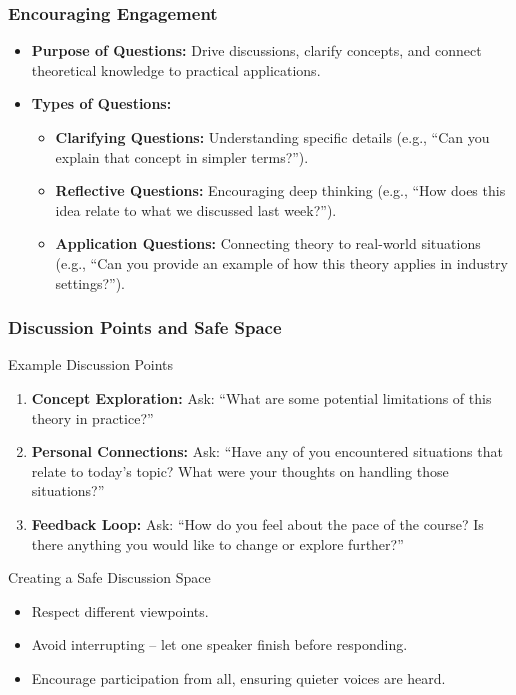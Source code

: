 \documentclass[aspectratio=169]{beamer}
\begin{document}
\begin{frame}[fragile]
  \frametitle{Encouraging Engagement}
  \begin{itemize}
    \item \textbf{Purpose of Questions:} Drive discussions, clarify concepts, and connect theoretical knowledge to practical applications.
    \item \textbf{Types of Questions:}
      \begin{itemize}
        \item \textbf{Clarifying Questions:} Understanding specific details (e.g., ``Can you explain that concept in simpler terms?'').
        \item \textbf{Reflective Questions:} Encouraging deep thinking (e.g., ``How does this idea relate to what we discussed last week?'').
        \item \textbf{Application Questions:} Connecting theory to real-world situations (e.g., ``Can you provide an example of how this theory applies in industry settings?'').
      \end{itemize}
  \end{itemize}
\end{frame}

\begin{frame}[fragile]
  \frametitle{Discussion Points and Safe Space}
  \begin{block}{Example Discussion Points}
    \begin{enumerate}
      \item \textbf{Concept Exploration:} Ask: ``What are some potential limitations of this theory in practice?''
      \item \textbf{Personal Connections:} Ask: ``Have any of you encountered situations that relate to today’s topic? What were your thoughts on handling those situations?''
      \item \textbf{Feedback Loop:} Ask: ``How do you feel about the pace of the course? Is there anything you would like to change or explore further?''
    \end{enumerate}
  \end{block}
  
  \begin{block}{Creating a Safe Discussion Space}
    \begin{itemize}
      \item Respect different viewpoints.
      \item Avoid interrupting – let one speaker finish before responding.
      \item Encourage participation from all, ensuring quieter voices are heard.
    \end{itemize}
  \end{block}
\end{frame}
\end{document}
